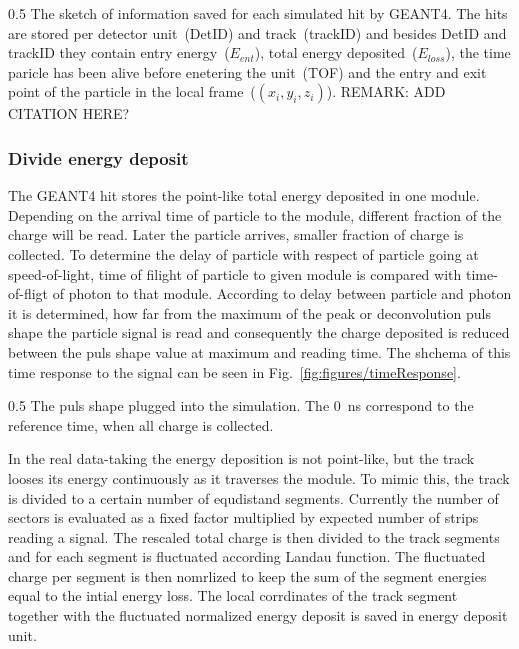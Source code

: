                  {0.5}       %
                 { The sketch of information saved for each simulated hit by GEANT4. The hits are stored per detector unit~(DetID) and track~(trackID) and besides DetID and trackID they contain entry energy~($E_{ent}$), total energy deposited~($E_{loss}$), the time paricle has been alive before enetering the unit~(TOF) and the entry and exit point of the particle in the local frame~($(x_{i},y_{i},z_{i})$). REMARK: ADD CITATION HERE?}

\subsubsection{Divide energy deposit}

The GEANT4 hit stores the point-like total energy deposited in one module. Depending on the arrival time of particle to the module, different fraction of the charge will be read. Later the particle arrives, smaller fraction of charge is collected. To determine the delay of particle with respect of particle going at speed-of-light, time of filight of particle to given module is compared with time-of-fligt of photon to that module. According to delay between particle and photon it is determined, how far from the maximum of the  peak or deconvolution puls shape the particle signal is read and consequently the charge deposited is reduced between the puls shape value at maximum and reading time. The shchema of this time response to the signal can be seen in Fig.~\ref{fig:figures/timeResponse}.


                 {0.5}       %
                 { The puls shape plugged into the simulation. The 0~ns correspond to the reference time, when all charge is collected.  }

In the real data-taking the energy deposition is not point-like, but the track looses its energy continuously as it traverses the module. To mimic this, the track is divided to a certain number of equdistand segments. Currently the number of sectors is evaluated as a fixed factor multiplied by expected number of strips reading a signal. The rescaled total charge is then divided to the track segments and for each segment is fluctuated according Landau function. The fluctuated charge per segment is then nomrlized to keep the sum of the segment energies equal to the intial energy loss. The local corrdinates of the track segment together with the fluctuated normalized energy deposit is saved in energy deposit unit.

